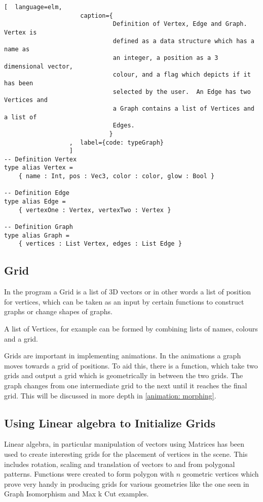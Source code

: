 \begin{lstlisting}[  language=elm, 
                     caption={
                              Definition of Vertex, Edge and Graph.  Vertex is
                              defined as a data structure which has a name as
                              an integer, a position as a 3 dimensional vector,
                              colour, and a flag which depicts if it has been
                              selected by the user.  An Edge has two Vertices and
                              a Graph contains a list of Vertices and a list of
                              Edges.
                             }
                  ,  label={code: typeGraph}
                  ]
-- Definition Vertex
type alias Vertex =
    { name : Int, pos : Vec3, color : color, glow : Bool }

-- Definition Edge
type alias Edge =
    { vertexOne : Vertex, vertexTwo : Vertex }

-- Definition Graph
type alias Graph =
    { vertices : List Vertex, edges : List Edge }
\end{lstlisting}

\subsection{Grid}
In the program a Grid is a list of 3D vectors or in other words a list of
position for vertices, which can be taken as an input by certain functions to
construct graphs or change shapes of graphs. 

A list of Vertices, for example can be formed by combining lists of
names, colours and a grid.

Grids are important in implementing animations. In the animations a graph moves
towards a grid of positions. To aid this, there is a function, which take
two grids and output a grid which is geometrically in between the two grids.
The graph changes from one intermediate grid to the next until it
reaches the final grid. This will be discussed in more depth in \autoref{animation:
morphing}.

\subsection{Using Linear algebra to Initialize Grids}
Linear algebra, in particular manipulation of vectors using Matrices has been
used to create interesting grids for the placement of vertices in the scene.
This includes rotation, scaling and translation of vectors to and from polygonal
patterns. Functions were created to form polygon with $n$ geometric vertices
which prove very handy in producing grids for various geometries like
the one seen in Graph Isomorphism and Max k Cut examples.

